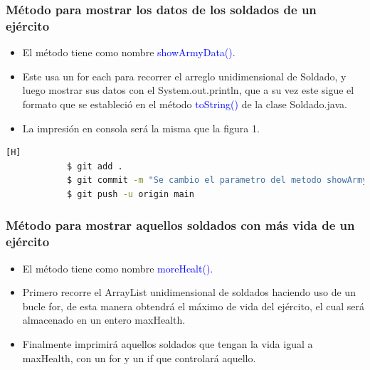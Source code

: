 \documentclass{article}
\begin{document}
        
        
        
        \subsubsection{Método para mostrar los datos de los soldados de un ejército}

        \begin{itemize}
            \item El método tiene como nombre \textcolor{blue}{showArmyData()}.
            \item Este usa un for each para recorrer el arreglo unidimensional de Soldado, y luego mostrar sus datos con el System.out.println, que a su vez este sigue el formato que se estableció en el método \textcolor{blue}{toString()} de la clase Soldado.java.
            \item La impresión en consola será la misma que la figura 1.
        \end{itemize}

        

        \begin{lstlisting}[language=bash,caption={Commit: Se adaptó e implementó el método para mostrar los datos de los soldados de un ejército}][H]
    		$ git add .
    		$ git commit -m "Se cambio el parametro del metodo showArmyData a un ArrayList, de esta manera recibira los ArrayList de ambos ejercitos"
    		$ git push -u origin main
    	\end{lstlisting}
        
        
        \subsubsection{Método para mostrar aquellos soldados con más vida de un ejército}
        
        \begin{itemize}
            \item El método tiene como nombre \textcolor{blue}{moreHealt()}.
            \item Primero recorre el ArrayList unidimensional de soldados haciendo uso de un bucle for, de esta manera obtendrá el máximo de vida del ejército, el cual será almacenado en un entero maxHealth.
            \item Finalmente imprimirá aquellos soldados que tengan la vida igual a maxHealth, con un for y un if que controlará aquello.

        \end{itemize}
\end{document}
